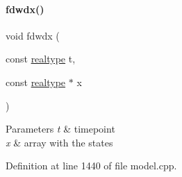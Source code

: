 \paragraph{\texorpdfstring{fdwdx()}{fdwdx()}\hspace{0.1cm}{\footnotesize\ttfamily [1/2]}}
{\footnotesize\ttfamily void fdwdx (\begin{DoxyParamCaption}\item[{const \mbox{\hyperlink{namespaceamici_a1bdce28051d6a53868f7ccbf5f2c14a3}{realtype}}}]{t,  }\item[{const \mbox{\hyperlink{namespaceamici_a1bdce28051d6a53868f7ccbf5f2c14a3}{realtype}} $\ast$}]{x }\end{DoxyParamCaption})}


\begin{DoxyParams}{Parameters}
{\em t} & timepoint \\
\hline
{\em x} & array with the states \\
\hline
\end{DoxyParams}


Definition at line 1440 of file model.\+cpp.

